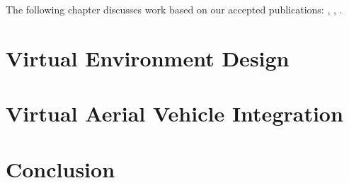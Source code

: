 The following chapter discusses work based on our accepted publications: \cite{Smyth2018AInvestigation}, \cite{Smyth2018UsingDrones}, \cite{Smyth2018ASupport}.


\section{Virtual Environment Design}


\pagebreak
\section{Virtual Aerial Vehicle Integration}\label{sec:AirSimIntegration}


\section{Conclusion}\label{sec:VirtualEnvConclusion}
